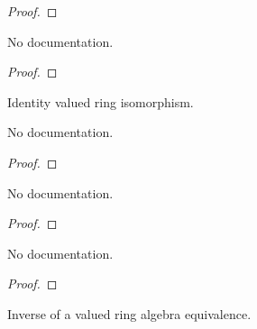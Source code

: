 \begin{proof}
    \leanok
\end{proof}

\begin{theorem}\label{ValAlgHom.comp_id}
        \leanok
                No documentation.
    \end{theorem}

\begin{proof}
    \leanok
\end{proof}

\begin{definition}\label{ValAlgEquiv.refl}
        \leanok
                Identity valued ring isomorphism.
    \end{definition}

\begin{theorem}\label{ValAlgEquiv.coe_refl}
        \leanok
                No documentation.
    \end{theorem}

\begin{proof}
    \leanok
\end{proof}

\begin{theorem}\label{ValRingEquiv.refl_apply}
        \leanok
                No documentation.
    \end{theorem}

\begin{proof}
    \leanok
\end{proof}

\begin{theorem}\label{ValRingEquiv.refl_toEquiv}
        \leanok
                No documentation.
    \end{theorem}

\begin{proof}
    \leanok
\end{proof}

\begin{definition}\label{ValAlgEquiv.symm}
        \leanok
                Inverse of a valued ring algebra equivalence.
    \end{definition}

